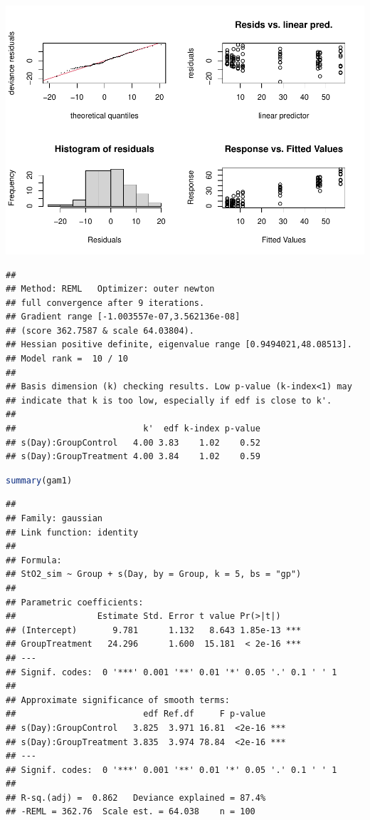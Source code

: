 \documentclass[
]{article}
\begin{document}
\includegraphics{Full_document_files/figure-latex/final-model-Appendix-1}

\begin{lstlisting}
## 
## Method: REML   Optimizer: outer newton
## full convergence after 9 iterations.
## Gradient range [-1.003557e-07,3.562136e-08]
## (score 362.7587 & scale 64.03804).
## Hessian positive definite, eigenvalue range [0.9494021,48.08513].
## Model rank =  10 / 10 
## 
## Basis dimension (k) checking results. Low p-value (k-index<1) may
## indicate that k is too low, especially if edf is close to k'.
## 
##                         k'  edf k-index p-value
## s(Day):GroupControl   4.00 3.83    1.02    0.52
## s(Day):GroupTreatment 4.00 3.84    1.02    0.59
\end{lstlisting}

\begin{lstlisting}[language=R]
summary(gam1)
\end{lstlisting}

\begin{lstlisting}
## 
## Family: gaussian 
## Link function: identity 
## 
## Formula:
## StO2_sim ~ Group + s(Day, by = Group, k = 5, bs = "gp")
## 
## Parametric coefficients:
##                Estimate Std. Error t value Pr(>|t|)    
## (Intercept)       9.781      1.132   8.643 1.85e-13 ***
## GroupTreatment   24.296      1.600  15.181  < 2e-16 ***
## ---
## Signif. codes:  0 '***' 0.001 '**' 0.01 '*' 0.05 '.' 0.1 ' ' 1
## 
## Approximate significance of smooth terms:
##                         edf Ref.df     F p-value    
## s(Day):GroupControl   3.825  3.971 16.81  <2e-16 ***
## s(Day):GroupTreatment 3.835  3.974 78.84  <2e-16 ***
## ---
## Signif. codes:  0 '***' 0.001 '**' 0.01 '*' 0.05 '.' 0.1 ' ' 1
## 
## R-sq.(adj) =  0.862   Deviance explained = 87.4%
## -REML = 362.76  Scale est. = 64.038    n = 100
\end{lstlisting}
\end{document}
